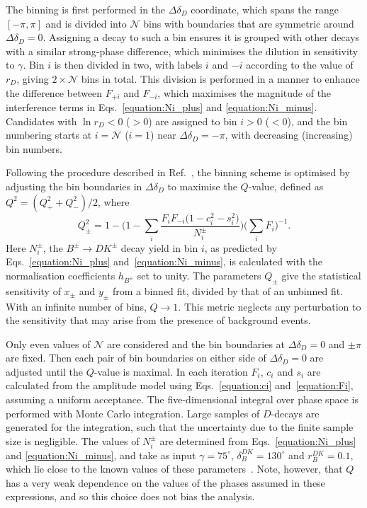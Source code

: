 \documentclass[12pt, a4paper, notitlepage, onecolumn]{article}
\begin{document}
The binning is first performed in the $\Delta\delta_D$ coordinate, which spans the range $[-\pi, \pi]$ and is divided into $\mathcal{N}$ bins with boundaries that are symmetric around $\Delta\delta_D=0$. Assigning a decay to such a bin ensures it is grouped with other decays with a similar strong-phase difference, which minimises the dilution in sensitivity to $\gamma$. Bin $i$ is then divided in two, with labels $i$ and $-i$ according to the value of $r_{D}$, giving $2 \times {\mathcal N}$ bins in total. This division is performed in a manner to enhance the difference between $F_{+i}$ and $F_{-i}$, which maximises the magnitude of the interference terms in Eqs.~\eqref{equation:Ni_plus} and \eqref{equation:Ni_minus}. Candidates with $\ln r_D < 0$ ($> 0$) are assigned to bin $i > 0$ ($< 0$), and the bin numbering starts at $i = \mathcal{N}$ ($i = 1$) near $\Delta\delta_D = -\pi$, with decreasing (increasing) bin numbers.

Following the procedure described in Ref.~\cite{HarnewS4pi}, the binning scheme is optimised by adjusting the bin boundaries in $\Delta \delta_D$ to maximise the $Q$-value, 
 defined as $Q^2 = (Q_+^2 + Q_-^2)/2$, where
\begin{equation}
    Q_\pm^2 = 1 - \Big(1 - \sum_i\frac{F_iF_{-i}\big(1 - c_i^2 - s_i^2\big)}{N_{i}^\pm}\Big)\Big(\sum_iF_i\Big)^{-1}.
    \label{equation:Qvalue}
\end{equation}
Here $N_i^\pm$, the $B^\pm \to DK^\pm$ decay yield in bin $i$, as predicted by Eqs.~\eqref{equation:Ni_plus} and~\eqref{equation:Ni_minus}, is calculated with the normalisation coefficients $h_{B^\pm}$ set to unity. The parameters $Q_{\pm}$ give the statistical sensitivity of $x_\pm$ and $y_\pm$ from a binned fit, divided by that of an unbinned fit. With an infinite number of bins, $Q\to 1$. This metric neglects any perturbation to the sensitivity that may arise from the presence of background events.

Only even values of $\mathcal{N}$ are considered and the bin boundaries at $\Delta\delta_D = 0$ and $\pm\pi$ are fixed. Then each pair of bin boundaries on either side of $\Delta\delta_D = 0$ are adjusted until the $Q$-value is maximal. In each iteration $F_i$, $c_i$ and $s_i$  are calculated from the amplitude model using Eqs.~\eqref{equation:ci} and~\eqref{equation:Fi}, assuming a uniform acceptance. The five-dimensional integral over phase space is performed with Monte Carlo integration. Large samples of $D$-decays are generated for the integration, such that the uncertainty due to the finite sample size is negligible. The values of $N_i^\pm$ are determined from Eqs.~\eqref{equation:Ni_plus} and \eqref{equation:Ni_minus}, and take as input $\gamma = 75^\circ$, $\delta^{DK}_B = 130^\circ$ and $r^{DK}_B = 0.1$, which lie close to the known values of these parameters~\cite{LHCb-PAPER-2021-033}. Note, however, that $Q$ has a very weak dependence on the values of the phases assumed in these expressions, and so this choice does not bias the analysis.
\end{document}
